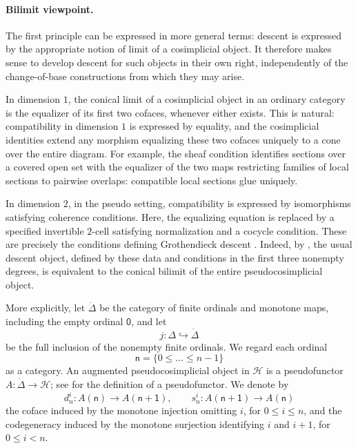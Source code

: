 \documentclass[11pt,a4paper]{article}
\numberwithin{equation}{section}
\theoremstyle{definition}
\theoremstyle{remark}
\newcommand{\Hcat}{\mathcal H}
\begin{document}
\paragraph{Bilimit viewpoint.}
The first principle can be expressed in more general terms: descent is
expressed by the appropriate notion of limit of a cosimplicial object.
It therefore makes sense to develop descent for such objects in their
own right, independently of the change-of-base constructions from
which they may arise.

In dimension \(1\), the conical limit of a cosimplicial object in an
ordinary category is the equalizer of its first two cofaces, whenever
either exists. This is natural:
compatibility in dimension \(1\) is expressed by equality, and the
cosimplicial identities extend any morphism equalizing these two
cofaces uniquely to a cone over the entire diagram. For example,
the sheaf condition identifies sections over a covered open set
with the equalizer of the two maps restricting families of local
sections to pairwise overlaps: compatible local sections glue uniquely.

In dimension \(2\), in the pseudo
setting, compatibility is expressed by isomorphisms satisfying
coherence conditions. Here, the equalizing equation is replaced by a
specified invertible \(2\)-cell satisfying normalization and a cocycle
condition. These are precisely the conditions defining Grothendieck
descent \cite{Grothendieck1971,JanelidzeTholen1994,Pavlovic1991}.
Indeed, by \cite[Theorem~4.11 and Remark~4.4]{Nunes2018}, the usual
descent object, defined by these data and conditions in the first
three nonempty degrees, is equivalent to the conical bilimit of the
entire pseudocosimplicial object.

More explicitly, let \(\dot\Delta\) be the category of finite ordinals
and monotone maps, including the empty ordinal \(\mathsf0\), and let
\[
j\colon\Delta\hookrightarrow\dot\Delta
\]
be the full inclusion of the nonempty finite ordinals. We regard each ordinal
\[
\mathsf n=\{0\leq\ldots\leq n-1\}
\]
as a category. An augmented pseudocosimplicial object in \(\Hcat\)
is a pseudofunctor \(A\colon\dot\Delta\longrightarrow\Hcat\);
see \cite[Definition~2.1]{Nunes2016} for the definition of a
pseudofunctor.
We denote by
\begin{equation}
d_n^i\colon A(\mathsf n)\longrightarrow A(\mathsf{n+1}),
\qquad s_n^i\colon A(\mathsf{n+1})\longrightarrow A(\mathsf n)
\end{equation}
the coface induced by the monotone injection omitting \(i\), for
\(0\leq i\leq n\), and the codegeneracy induced by the monotone
surjection identifying \(i\) and \(i+1\), for \(0\leq i<n\).
\end{document}
